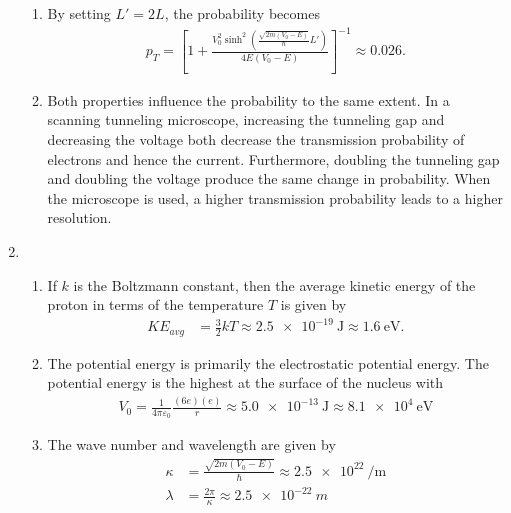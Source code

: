 \documentclass[a4paper,12pt]{article}
\begin{document}
\begin{enumerate}
\begin{enumerate}
            \item
                By setting $L' = 2L$, the probability becomes
                \begin{align*}
                    p_T = \left[ 1 + \frac{V_0^2 \sinh^2(\frac{\sqrt{2m(V_0 - E)}}{\hbar} L')}{4E(V_0 - E)} \right]^{-1} \approx 0.026.
                \end{align*}

            \item
                Both properties influence the probability to the same extent. In a scanning tunneling microscope, increasing the tunneling gap and decreasing the voltage both decrease the transmission probability of electrons and hence the current. Furthermore, doubling the tunneling gap and doubling the voltage produce the same change in probability. When the microscope is used, a higher transmission probability leads to a higher resolution.
        \end{enumerate}

    \item
        \begin{enumerate}
            \item
                If $k$ is the Boltzmann constant, then the average kinetic energy of the proton in terms of the temperature $T$ is given by
                \begin{align*}
                    KE_{avg} &= \frac{3}{2} kT \approx \SI{2.5e-19}{\J} \approx \SI{1.6}{\eV}.
                \end{align*}

            \item
                The potential energy is primarily the electrostatic potential energy. The potential energy is the highest at the surface of the nucleus with
                \begin{align*}
                    V_0 = \frac{1}{4 \pi \varepsilon_0} \frac{(6e) (e)}{r} \approx \SI{5.0e-13}{\J} \approx \SI{8.1e4}{\eV}
                \end{align*}
                
            \item
                The wave number and wavelength are given by
                \begin{align*}
                    \kappa &= \frac{\sqrt{2m(V_0 - E)}}{\hbar} \approx \SI{2.5e22}{\per\meter} \\
                    \lambda &= \frac{2 \pi}{\kappa} \approx \SI{2.5e-22}{m}
                \end{align*}


\end{enumerate}
\end{enumerate}
\end{document}
